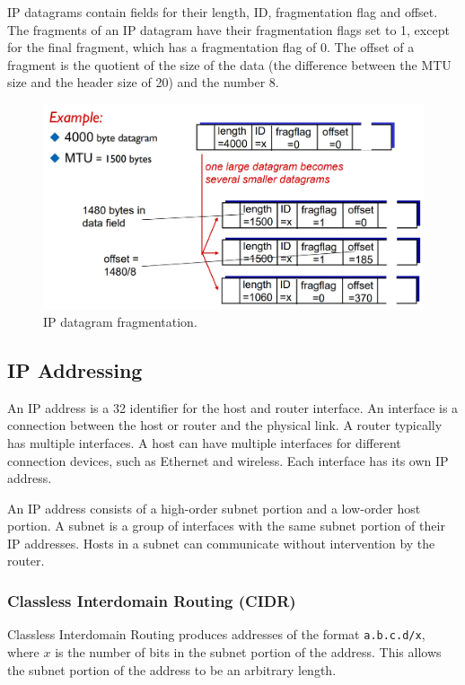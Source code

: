 IP datagrams contain fields for their length, ID, fragmentation flag and offset.
The fragments of an IP datagram have their fragmentation flags set to \num{1}, except for the final fragment, which has a fragmentation flag of \num{0}.
The offset of a fragment is the quotient of the size of the data (the difference between the MTU size and the header size of \SI{20}{\byte}) and the number \num{8}.

\begin{figure}[htp]
  \centering
  \includegraphics[width=15cm]{unit-19/figures/fragmentation.png}
  \caption*{IP datagram fragmentation.}
\end{figure}

\subsection{IP Addressing}

An IP address is a \SI{32}{\bit} identifier for the host and router interface.
An interface is a connection between the host or router and the physical link.
A router typically has multiple interfaces.
A host can have multiple interfaces for different connection devices, such as Ethernet and wireless.
Each interface has its own IP address.

An IP address consists of a high-order subnet portion and a low-order host portion.
A subnet is a group of interfaces with the same subnet portion of their IP addresses.
Hosts in a subnet can communicate without intervention by the router.

\subsubsection{Classless Interdomain Routing (CIDR)}

Classless Interdomain Routing produces addresses of the format \texttt{a.b.c.d/x}, where \(x\) is the number of bits in the subnet portion of the address.
This allows the subnet portion of the address to be an arbitrary length.

